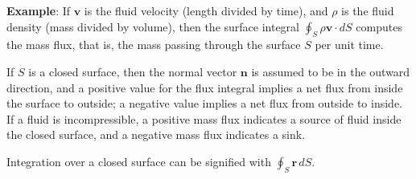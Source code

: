 \begin{paracol}{2}
\switchcolumn


\textbf{Example}: If $\mathbf{v}$ is the fluid velocity (length divided by time), and $\rho$ is the fluid density (mass divided by volume), then the surface integral $\oint_S \rho \mathbf{v} \cdot dS$ computes the mass flux, that is, the mass passing through the surface $S$ per unit time.

If $S$ is a closed surface, then the normal vector $\mathbf{n}$ is assumed to be in the outward direction, and a positive value for the flux integral implies a net flux from inside the surface to outside; a negative value implies a net flux from outside to inside. If a fluid is incompressible, a positive mass flux indicates a source of fluid inside the closed surface, and a negative mass flux indicates a sink.


Integration over a closed surface can be signified with $\oint_S \mathbf{r} \, dS$.

\end{paracol}

